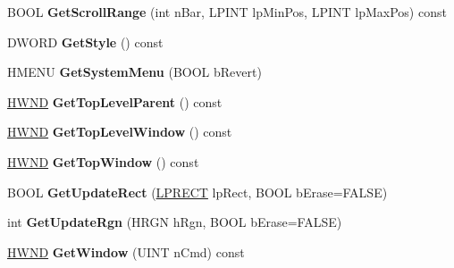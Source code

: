 \begin{DoxyCompactItemize}
\mbox{\label{class_a_t_l_1_1_c_window_af8cf58b39fc9848d8138209a9bfe7b4b}} 
B\+O\+OL {\bfseries Get\+Scroll\+Range} (int n\+Bar, L\+P\+I\+NT lp\+Min\+Pos, L\+P\+I\+NT lp\+Max\+Pos) const
\item 
\mbox{\label{class_a_t_l_1_1_c_window_a054b873b6bc67064e5719687b79aba03}} 
D\+W\+O\+RD {\bfseries Get\+Style} () const
\item 
\mbox{\label{class_a_t_l_1_1_c_window_a1ca594abcea666c3606f4dff7c8f5f1d}} 
H\+M\+E\+NU {\bfseries Get\+System\+Menu} (B\+O\+OL b\+Revert)
\item 
\mbox{\label{class_a_t_l_1_1_c_window_a4b27a5920ec67ef615133bf28f5bd208}} 
\hyperlink{interfacevoid}{H\+W\+ND} {\bfseries Get\+Top\+Level\+Parent} () const
\item 
\mbox{\label{class_a_t_l_1_1_c_window_a7157439e85cfda9c5f68b1ae0d040d80}} 
\hyperlink{interfacevoid}{H\+W\+ND} {\bfseries Get\+Top\+Level\+Window} () const
\item 
\mbox{\label{class_a_t_l_1_1_c_window_a491d07da7c037b6a7e9af6377577f70d}} 
\hyperlink{interfacevoid}{H\+W\+ND} {\bfseries Get\+Top\+Window} () const
\item 
\mbox{\label{class_a_t_l_1_1_c_window_a7c85822a5f803b4481a9a49d6cbf6b76}} 
B\+O\+OL {\bfseries Get\+Update\+Rect} (\hyperlink{structtag_r_e_c_t}{L\+P\+R\+E\+CT} lp\+Rect, B\+O\+OL b\+Erase=F\+A\+L\+SE)
\item 
\mbox{\label{class_a_t_l_1_1_c_window_a8ff1947ec8425f78906c287ec71b497e}} 
int {\bfseries Get\+Update\+Rgn} (H\+R\+GN h\+Rgn, B\+O\+OL b\+Erase=F\+A\+L\+SE)
\item 
\mbox{\label{class_a_t_l_1_1_c_window_a7f4625906fa912d9ce5a8d088c573bb6}} 
\hyperlink{interfacevoid}{H\+W\+ND} {\bfseries Get\+Window} (U\+I\+NT n\+Cmd) const
\item 
\mbox{\label{class_a_t_l_1_1_c_window_a03e4c2774c7db1afb034489be0c1efdc}} 

\end{DoxyCompactItemize}
